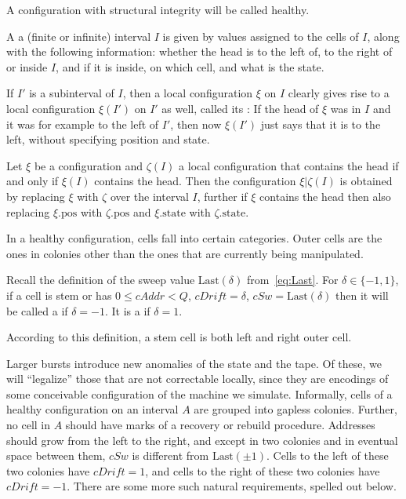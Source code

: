 \documentclass[12pt]{memoir}
\newcommand{\fld}[1]{\ensuremath{\textit{#1}}}
\newcommand{\pos}{\mathrm{pos}}
\newcommand{\cAddr}{\fld{cAddr}}
\newcommand{\cDrift}{\fld{cDrift}}
\newcommand{\cSweep}{\fld{cSw}}
\newcommand{\Last}{\mathrm{Last}}
\newcommand{\state}{\mathrm{state}}
\begin{document}
A configuration with structural integrity will be called healthy.

\begin{definition}
\label{def:local-config}
  A  a (finite or infinite)
  interval \( I \) is given by values assigned to the cells
  of \( I \), along with the following information: whether
  the head is to the left of, to the right of or inside
  \( I \), and if it is inside, on which cell, and what is
  the state.

  If \( I' \) is a subinterval of \( I \), then a local configuration
  \( \xi \) on \( I \) clearly gives rise to a local configuration
  \( \xi(I') \) on \( I' \) as well, called its
  : If the head of \( \xi \) was in \( I \)
  and it was for example to the left of \( I' \), then now
  \( \xi(I') \) just says that it is to the left, without
  specifying position and state.

  Let \( \xi \) be a configuration and \( \zeta(I) \) a local
  configuration that contains the head if and only if
  \( \xi(I) \) contains the head.
  Then the configuration \( \xi|\zeta(I) \) is obtained by
  replacing \( \xi \) with \( \zeta \) over the interval \( I \),
  further if \( \xi \) contains the head then also replacing
  \( \xi.\pos \) with \( \zeta.\pos \) and \( \xi.\state \) with
  \( \zeta.\state \).
\end{definition}

In a healthy configuration, cells fall into certain categories.
Outer cells are the ones in colonies other than the ones that 
are currently being manipulated.

\begin{definition}\label{def:outer-cells}
    Recall the definition of the sweep value
    \(  \Last(\delta)  \) from~\eqref{eq:Last}.
    For \( \delta \in \{ -1,1 \} \), if a cell is stem or
    has \( 0 \le \cAddr < Q \),
    \( \cDrift = \delta \),
    \( \cSweep = \Last(\delta) \)
    then it will be called a  if
    \( \delta = -1 \).
    It is a  if \( \delta = 1 \).
\end{definition}

According to this definition, a stem cell is both left and right outer cell.

Larger bursts introduce new anomalies of the state and the tape.
Of these, we will ``legalize'' those that are not correctable locally,
since they are encodings
of some conceivable configuration of the machine we simulate.
Informally, cells of a healthy configuration on an interval \( A \)
are grouped into gapless colonies.
Further, no cell in \( A \) should have marks of a recovery or
rebuild procedure.
Addresses should grow from the left to the right, and except in two colonies
and in eventual space between them, \( \cSweep \) is different
from \( \Last(\pm 1) \).
Cells to the left of these two colonies have \( \cDrift = 1 \),
and cells to the right of these two colonies have \( \cDrift = -1 \).
There are some more such natural requirements, spelled out below.
\end{document}
